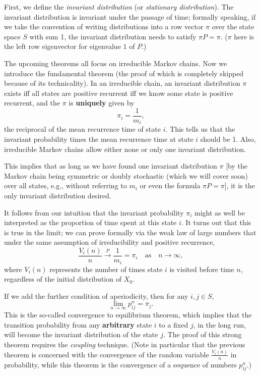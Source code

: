 \documentclass[11pt]{article}
\begin{document}
First, we define the \textit{invariant distribution} (or \textit{stationary distribution}). The invariant distribution is invariant under the passage of time; formally speaking, if we take the convention of writing distributions into a row vector $\pi $ over the state space $S$ with sum 1, the invariant distribution needs to satisfy $\pi P=\pi $. ($\pi $ here is the left row eigenvector for eigenvalue $1$ of $P$.)

The upcoming theorems all focus on irreducible Markov chains. Now we introduce the fundamental theorem (the proof of which is completely skipped because of its technicality). In an irreducible chain, an invariant distribution $\pi $ exists iff all states are positive recurrent iff we know some state is positive recurrent, and the $\pi $ is \textbf{uniquely} given by
\[
\pi _{i}=\frac{1}{m_{i}},
\]
the reciprocal of the mean recurrence time of state $i$. This tells us that the invariant probability times the mean recurrence time at state $i$ should be 1. Also, irreducible Markov chains allow either none or only one invariant distribution.

This implies that as long as we have found one invariant distribution $\pi$ [by the Markov chain being symmetric or doubly stochastic (which we will cover soon) over all states, e.g., without referring to $m_{i}$ or even the formula $\pi P=\pi $], it is the only invariant distribution desired.

It follows from our intuition that the invariant probability $\pi _{i}$ might as well be interpreted as the proportion of time spent at this state $i$. It turns out that this is true in the limit; we can prove formally via the weak law of large numbers that under the same assumption of irreducibility and positive recurrence,
\[
\frac{V_{i}(n)}{n} \overset{P}{\to} \frac{1}{m_{i}}=\pi_i \quad \text{as} \quad n \rightarrow \infty ,\]
where $V_{i}(n)$ represents the number of times state $i$ is visited before time $n$, regardless of the initial distribution of $X_{0}$.

If we add the further condition of aperiodicity, then for any $i,j\in S$,
\[
\lim _{n\rightarrow \infty }p_{ij}^{n}=\pi_{j}.
\]
This is the so-called convergence to equilibrium theorem, which implies that the transition probability from any \textbf{arbitrary} state $i$ to a fixed $j$, in the long run, will become the invariant distribution of the state $j$. The proof of this strong theorem requires the \textit{coupling} technique.
(Note in particular that the previous theorem is concerned with the convergence of the random variable $\frac{V_{i}(n)}{n}$ in probability, while this theorem is the convergence of a sequence of numbers $p_{ij}^{n}$.)
\end{document}
